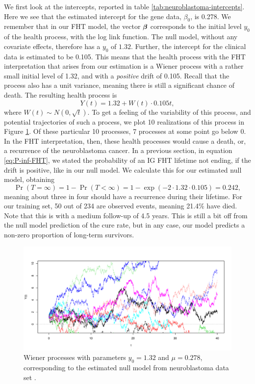 We first look at the intercepts, reported in table \ref{tab:neuroblastoma-intercepts}.
Here we see that the estimated intercept for the gene data, $\beta_0$, is 0.278.
We remember that in our FHT model, the vector $\boldsymbol{\beta}$ corresponds to the initial level $y_0$ of the health process, with the log link function.
The null model, without any covariate effects, therefore has a $y_0$ of $1.32$.
Further, the intercept for the clinical data is estimated to be 0.105.
This means that the health process with the FHT interpretation that arises from our estimation is a Wiener process with a rather small initial level of 1.32, and with a \textit{positive} drift of 0.105.
Recall that the process also has a unit variance, meaning there is still a significant chance of death.
The resulting health process is
\begin{equation}
    Y(t)=1.32+W(t)\cdot0.105t,
\end{equation}
where $W(t)\sim N(0,\sqrt{t})$.
To get a feeling of the variability of this process, and potential trajectories of such a process, we plot 10 realizations of this process in Figure \ref{fig:neuroblastoma-wiener}.
Of these particular 10 processes, 7 processes at some point go below 0.
In the FHT interpretation, then, these health processes would cause a death, or, a recurrence of the neuroblastoma cancer.
In a previous section, in equation \eqref{eq:P-inf-FHT}, we stated the probability of an IG FHT lifetime not ending, if the drift is positive, like in our null model.
We calculate this for our estimated null model, obtaining
\begin{equation*}
    \Pr{(T=\infty)}=1-\Pr{(T<\infty)}=1-\exp{(-2\cdot 1.32\cdot 0.105)}=0.242,
\end{equation*}
meaning about three in four should have a recurrence during their lifetime.
For our training set, 50 out of 234 are observed events, meaning 21.4\% have died.
Note that this is with a medium follow-up of 4.5 years.
This is still a bit off from the null model prediction of the cure rate, but in any case, our model predicts a non-zero proportion of long-term survivors.
\begin{figure}\label{fig:neuroblastoma-wiener}
\caption{Wiener processes with parameters $y_0=1.32$ and $\mu=0.278$, corresponding to the estimated null model from neuroblastoma data set \citep{oberthuer-data}.}
\centering\includegraphics[scale=0.4]{figures/oberthuer-wiener-procs.pdf}
\end{figure}

